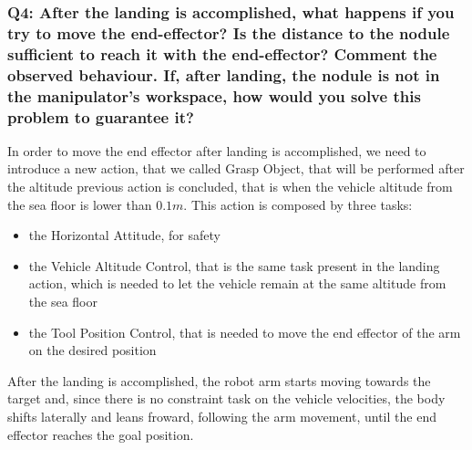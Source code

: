 \documentclass{article}
\begin{document}
\subsubsection{Q4: After the landing is accomplished, what happens if you try to move the end-effector? Is the distance to the nodule sufficient to reach it with the end-effector? Comment the observed behaviour. If, after landing, the nodule is not in the manipulator's workspace, how would you solve this problem to guarantee it?}

In order to move the end effector after landing is accomplished, we need to introduce a new action, that we called Grasp Object, that will be performed after the altitude previous action is concluded, that is when the vehicle altitude from the sea floor is lower than \(0.1 m\). This action is composed by three tasks: 
\begin{itemize}
	\item the Horizontal Attitude, for safety
	\item the Vehicle Altitude Control, that is the same task present in the landing action, which is needed to let the vehicle remain at the same altitude from the sea floor
	\item the Tool Position Control, that is needed to move the end effector of the arm on the desired position
\end{itemize}
After the landing is accomplished, the robot arm starts moving towards the target and, since there is no constraint task on the vehicle velocities, the body shifts laterally and leans froward, following the arm movement, until the end effector reaches the goal position.
\end{document}
